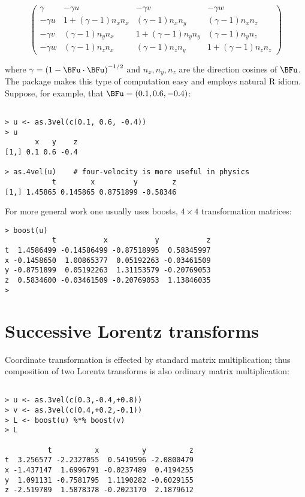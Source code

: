 \documentclass[ijoc,nonblindrev]{informs3} %
\begin{document}
\begin{equation}
  \begin{pmatrix}
\gamma &-\gamma u&-\gamma v&-\gamma w\\
    -\gamma u&1+(\gamma-1)n_xn_x&(\gamma-1)n_xn_y&(\gamma-1)n_xn_z\\
    -\gamma v&(\gamma-1)n_yn_x&1+(\gamma-1)n_yn_y&(\gamma-1)n_yn_z\\
    -\gamma w&(\gamma-1)n_zn_x&(\gamma-1)n_zn_y&1+(\gamma-1)n_zn_z
  \end{pmatrix}
\end{equation}

where $\gamma=\left(1-\BFu\cdot\BFu\right)^{-1/2}$ and $n_x,n_y,n_z$
are the direction cosines of $\BFu$.  The package makes this type of
computation easy and employs natural R idiom.  Suppose, for example,
that $\BFu=\left(0.1,0.6,-0.4\right)$:

\begin{verbatim}

> u <- as.3vel(c(0.1, 0.6, -0.4))
> u
       x   y    z
[1,] 0.1 0.6 -0.4

> as.4vel(u)    # four-velocity is more useful in physics
           t        x         y        z
[1,] 1.45865 0.145865 0.8751899 -0.58346

\end{verbatim}

For more general work one usually uses boosts, $4\times 4$
transformation matrices:

\begin{verbatim}
> boost(u) 
           t           x           y           z
t  1.4586499 -0.14586499 -0.87518995  0.58345997
x -0.1458650  1.00865377  0.05192263 -0.03461509
y -0.8751899  0.05192263  1.31153579 -0.20769053
z  0.5834600 -0.03461509 -0.20769053  1.13846035
> 

\end{verbatim}

\section{Successive Lorentz transforms}

Coordinate transformation is effected by standard matrix
multiplication; thus composition of two Lorentz transforms is also
ordinary matrix multiplication:

\begin{verbatim}

> u <- as.3vel(c(0.3,-0.4,+0.8))
> v <- as.3vel(c(0.4,+0.2,-0.1))
> L <- boost(u) %*% boost(v)
> L

          t          x          y          z
t  3.256577 -2.2327055  0.5419596 -2.0800479
x -1.437147  1.6996791 -0.0237489  0.4194255
y  1.091131 -0.7581795  1.1190282 -0.6029155
z -2.519789  1.5878378 -0.2023170  2.1879612

\end{verbatim}
\end{document}
